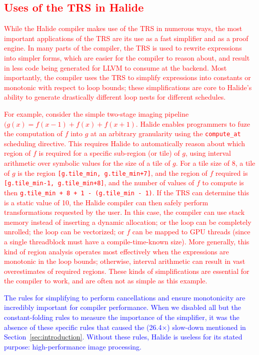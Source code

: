 \documentclass[acmsmall,review]{acmart}\settopmatter{printfolios=true,printccs=false,printacmref=false}
\newcommand{\modified}[1]{\textcolor{red}{{#1}}}
\newcommand{\modifiedagain}[1]{\textcolor{blue}{{#1}}}
\begin{document}
\subsection{\modified{Uses of the TRS in Halide}}
\label{sec:uses-of-trs}
\modified{While the Halide compiler makes use of the TRS in numerous ways, the most important
  applications of the TRS are its use as a fast simplifier and as a proof engine.  
  In many parts of the compiler, the TRS is used to rewrite expressions into simpler forms,
  which are easier for the compiler to reason about, and result in less code being generated for
  LLVM to consume at the backend.  Most importantly, the compiler uses the TRS to simplify expressions
  into constants or monotonic with respect to loop bounds; these simplifications are core to Halide's
  ability to generate drastically different loop nests for different schedules.}

\modified{For example, consider the simple two-stage imaging pipeline $(g(x) = f(x - 1) + f(x) + f(x + 1)$.
  Halide enables programmers to fuze the computation of $f$ into $g$ at an arbitrary granularity
  using the \texttt{compute\_at} scheduling directive.  This requires Halide to automatically reason
  about which region of $f$ is required for a specific sub-region (or tile) of $g$, using interval
  arithmetic over symbolic values for the size of a tile of $g$.  For a tile size of 8, a tile of $g$
  is the region \texttt{[g.tile\_min, g.tile\_min+7]}, and the region of $f$ required is
  \texttt{[g.tile\_min-1, g.tile\_min+8]}, and the number of values of $f$ to compute is then
  \texttt{g.tile\_min + 8 + 1 - (g.tile\_min - 1)}.  If the TRS can determine this is a static value
  of 10, the Halide compiler can then safely perform transformations requested by the user.  In this
  case, the compiler can use stack memory instead of inserting a dynamic allocation; or the loop can be
  completely unrolled; the loop can be vectorized; or $f$ can be mapped to GPU threads (since a single
  threadblock must have a compile-time-known size).  More generally, this kind of region analysis
  operates most effectively when the expressions are monotonic in the loop bounds; otherwise, interval
  arithmetic can result in vast overestimates of required regions.  These kinds of simplifications are essential
  for the compiler to work, and are often not as simple as this example.}

\modifiedagain{The rules for simplifying to perform cancellations and
  ensure monotonicity are incredibly important for compiler
  performance. When we disabled all but the constant-folding rules to
  measure the importance of the simplifier, it was the absence of
  these specific rules that caused the (26.4$\times$) slow-down
  mentioned in Section~\ref{sec:introduction}. Without these rules,
  Halide is useless for its stated purpose: high-performance image
  processing.}
\end{document}
